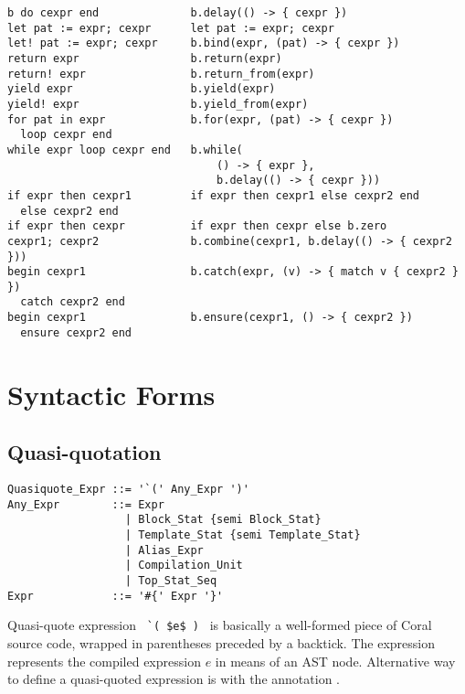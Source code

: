 \begin{lstlisting}
b do cexpr end              b.delay(() -> { cexpr })
let pat := expr; cexpr      let pat := expr; cexpr
let! pat := expr; cexpr     b.bind(expr, (pat) -> { cexpr })
return expr                 b.return(expr)
return! expr                b.return_from(expr)
yield expr                  b.yield(expr)
yield! expr                 b.yield_from(expr)
for pat in expr             b.for(expr, (pat) -> { cexpr })
  loop cexpr end 
while expr loop cexpr end   b.while(
                                () -> { expr }, 
                                b.delay(() -> { cexpr }))
if expr then cexpr1         if expr then cexpr1 else cexpr2 end
  else cexpr2 end
if expr then cexpr          if expr then cexpr else b.zero
cexpr1; cexpr2              b.combine(cexpr1, b.delay(() -> { cexpr2 }))
begin cexpr1                b.catch(expr, (v) -> { match v { cexpr2 } })
  catch cexpr2 end
begin cexpr1                b.ensure(cexpr1, () -> { cexpr2 })
  ensure cexpr2 end
\end{lstlisting}






\section{Syntactic Forms}
\label{sec:syntactic-forms}

\subsection{Quasi-quotation}
\label{sec:quasi-quotation}

\syntax\begin{lstlisting}
Quasiquote_Expr ::= '`(' Any_Expr ')'
Any_Expr        ::= Expr
                  | Block_Stat {semi Block_Stat}
                  | Template_Stat {semi Template_Stat}
                  | Alias_Expr
                  | Compilation_Unit
                  | Top_Stat_Seq
Expr            ::= '#{' Expr '}'
\end{lstlisting}

Quasi-quote expression ~\lstinline!`( $e$ )!~ is basically a well-formed piece of Coral source code, wrapped in parentheses preceded by a backtick. The expression represents the compiled expression $e$ in means of an AST node. Alternative way to define a quasi-quoted expression is with the annotation .

